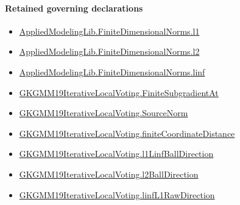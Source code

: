 \documentclass[10pt]{article}
\begin{document}
\paragraph{Retained governing declarations}
\begin{itemize}\raggedright
\item \hyperlink{governing-declaration-3d99a970244a38c7}{Applied\allowbreak{}Modeling\allowbreak{}Lib.\allowbreak{}Finite\allowbreak{}Dimensional\allowbreak{}Norms.\allowbreak{}l1}
\item \hyperlink{governing-declaration-08313452edb53fe9}{Applied\allowbreak{}Modeling\allowbreak{}Lib.\allowbreak{}Finite\allowbreak{}Dimensional\allowbreak{}Norms.\allowbreak{}l2}
\item \hyperlink{governing-declaration-1a7ba4652046f8ed}{Applied\allowbreak{}Modeling\allowbreak{}Lib.\allowbreak{}Finite\allowbreak{}Dimensional\allowbreak{}Norms.\allowbreak{}linf}
\item \hyperlink{governing-declaration-e4f39da4bff46cef}{GKGMM19\allowbreak{}Iterative\allowbreak{}Local\allowbreak{}Voting.\allowbreak{}Finite\allowbreak{}Subgradient\allowbreak{}At}
\item \hyperlink{governing-declaration-6fa4ab9852321b03}{GKGMM19\allowbreak{}Iterative\allowbreak{}Local\allowbreak{}Voting.\allowbreak{}Source\allowbreak{}Norm}
\item \hyperlink{governing-declaration-54228ebaec750c58}{GKGMM19\allowbreak{}Iterative\allowbreak{}Local\allowbreak{}Voting.\allowbreak{}finite\allowbreak{}Coordinate\allowbreak{}Distance}
\item \hyperlink{governing-declaration-eecd4a34cea3f734}{GKGMM19\allowbreak{}Iterative\allowbreak{}Local\allowbreak{}Voting.\allowbreak{}l1\allowbreak{}Linf\allowbreak{}Ball\allowbreak{}Direction}
\item \hyperlink{governing-declaration-ede5cbc7998c0028}{GKGMM19\allowbreak{}Iterative\allowbreak{}Local\allowbreak{}Voting.\allowbreak{}l2\allowbreak{}Ball\allowbreak{}Direction}
\item \hyperlink{governing-declaration-be7dacc9d4750461}{GKGMM19\allowbreak{}Iterative\allowbreak{}Local\allowbreak{}Voting.\allowbreak{}linf\allowbreak{}L1\allowbreak{}Raw\allowbreak{}Direction}
\end{itemize}
\end{document}

